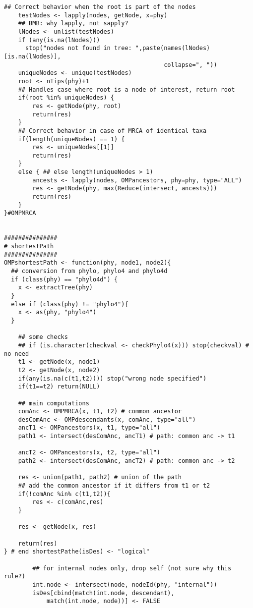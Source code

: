\documentclass[11pt,letterpaper]{article}
\begin{document}
\begin{lstlisting}[style=MyR]
    ## Correct behavior when the root is part of the nodes
    testNodes <- lapply(nodes, getNode, x=phy)
    ## BMB: why lapply, not sapply?
    lNodes <- unlist(testNodes)
    if (any(is.na(lNodes)))
      stop("nodes not found in tree: ",paste(names(lNodes)[is.na(lNodes)],
                                             collapse=", "))
    uniqueNodes <- unique(testNodes)
    root <- nTips(phy)+1
    ## Handles case where root is a node of interest, return root
    if(root %in% uniqueNodes) {
        res <- getNode(phy, root)
        return(res)
    }
    ## Correct behavior in case of MRCA of identical taxa
    if(length(uniqueNodes) == 1) {
        res <- uniqueNodes[[1]]
        return(res)
    }
    else { ## else length(uniqueNodes > 1)
        ancests <- lapply(nodes, OMPancestors, phy=phy, type="ALL")
        res <- getNode(phy, max(Reduce(intersect, ancests)))
        return(res)
    }
}#OMPMRCA


###############
# shortestPath
###############
OMPshortestPath <- function(phy, node1, node2){
  ## conversion from phylo, phylo4 and phylo4d
  if (class(phy) == "phylo4d") {
    x <- extractTree(phy)
  }
  else if (class(phy) != "phylo4"){
    x <- as(phy, "phylo4")
  }

    ## some checks
    ## if (is.character(checkval <- checkPhylo4(x))) stop(checkval) # no need
    t1 <- getNode(x, node1)
    t2 <- getNode(x, node2)
    if(any(is.na(c(t1,t2)))) stop("wrong node specified")
    if(t1==t2) return(NULL)

    ## main computations
    comAnc <- OMPMRCA(x, t1, t2) # common ancestor
    desComAnc <- OMPdescendants(x, comAnc, type="all")
    ancT1 <- OMPancestors(x, t1, type="all")
    path1 <- intersect(desComAnc, ancT1) # path: common anc -> t1

    ancT2 <- OMPancestors(x, t2, type="all")
    path2 <- intersect(desComAnc, ancT2) # path: common anc -> t2

    res <- union(path1, path2) # union of the path
    ## add the common ancestor if it differs from t1 or t2
    if(!comAnc %in% c(t1,t2)){
        res <- c(comAnc,res)
    }

    res <- getNode(x, res)

    return(res)
} # end shortestPathe(isDes) <- "logical"

        ## for internal nodes only, drop self (not sure why this rule?)
        int.node <- intersect(node, nodeId(phy, "internal"))
        isDes[cbind(match(int.node, descendant),
            match(int.node, node))] <- FALSE
        

\end{lstlisting}
\end{document}
